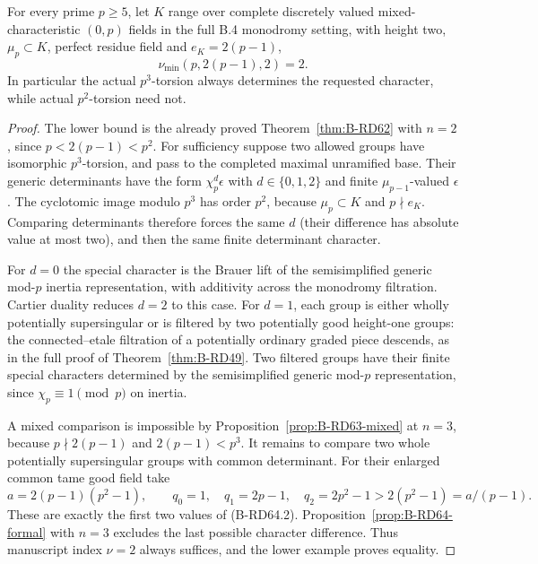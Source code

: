 \begin{theorem}
\label{thm:B-RD64}
For every prime $p\ge5$, let $K$ range over complete discretely
valued mixed-characteristic $(0,p)$ fields in the full B.4
monodromy setting, with height two, $\mu_p\subset K$, perfect
residue field and
$e_K=2(p-1)$,
\[
                         \nu_{\min}(p,2(p-1),2)=2.     \tag{B-RD64.9}
\]
In particular the actual $p^3$-torsion always determines the
requested character, while actual $p^2$-torsion need not.
\end{theorem}
\begin{proof}
The lower bound is the already proved Theorem~\ref{thm:B-RD62}
with $n=2$, since $p<2(p-1)<p^2$.
For sufficiency suppose two allowed groups have isomorphic
$p^3$-torsion, and pass to the completed maximal unramified
base. Their generic determinants have the form
$\chi_p^d\epsilon$ with $d\in\{0,1,2\}$ and finite
$\mu_{p-1}$-valued $\epsilon$. The cyclotomic image modulo
$p^3$ has order $p^2$, because $\mu_p\subset K$ and
$p\nmid e_K$. Comparing determinants therefore forces the
same $d$ (their difference has absolute value at most two),
and then the same finite determinant character.

For $d=0$ the special character is the Brauer lift of the
semisimplified generic mod-$p$ inertia representation, with
additivity across the monodromy filtration. Cartier duality
reduces $d=2$ to this case. For $d=1$, each group is either
wholly potentially supersingular or is filtered by two
potentially good height-one groups: the connected--etale
filtration of a potentially ordinary graded piece descends,
as in the full proof of Theorem~\ref{thm:B-RD49}.
Two filtered groups have their finite special characters
determined by the semisimplified generic mod-$p$ representation,
since $\chi_p\equiv1\pmod p$ on inertia.

A mixed comparison is impossible by
Proposition~\ref{prop:B-RD63-mixed} at $n=3$, because
$p\nmid2(p-1)$ and $2(p-1)<p^3$.
It remains to compare two whole potentially supersingular
groups with common determinant. For their enlarged common
tame good field take
\[
 a=2(p-1)(p^2-1),\qquad q_0=1,\quad q_1=2p-1,
 \quad q_2=2p^2-1>2(p^2-1)=a/(p-1).
\]
These are exactly the first two values of (B-RD64.2).
Proposition~\ref{prop:B-RD64-formal} with $n=3$ excludes the
last possible character difference. Thus manuscript index
$\nu=2$ always suffices, and the lower example proves equality.
\end{proof}

